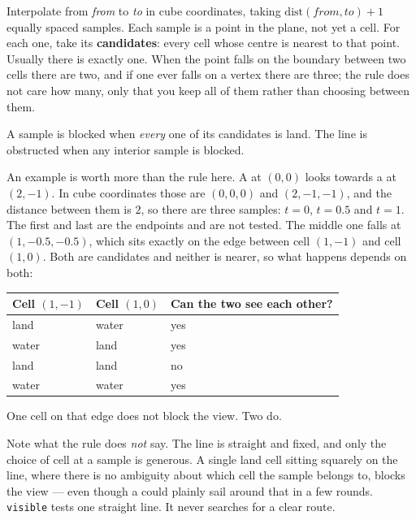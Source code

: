 \documentclass{article}
\begin{document}
Interpolate from \emph{from} to \emph{to} in cube coordinates, taking
$\mathrm{dist}(\mathit{from},\mathit{to}) + 1$ equally spaced samples. Each sample is a point in
the plane, not yet a cell. For each one, take its \textbf{candidates}: every cell whose centre is
nearest to that point. Usually there is exactly one. When the point falls on the boundary between
two cells there are two, and if one ever falls on a vertex there are three; the rule does not care
how many, only that you keep all of them rather than choosing between them.

\begin{center}
A sample is blocked when \emph{every} one of its candidates is land. The line is obstructed when
any interior sample is blocked.
\end{center}

An example is worth more than the rule here. A \ship{} at $(0,0)$ looks towards a \ship{} at
$(2,-1)$. In cube coordinates those are $(0,0,0)$ and $(2,-1,-1)$, and the distance between them is
$2$, so there are three samples: $t = 0$, $t = 0.5$ and $t = 1$. The first and last are the
endpoints and are not tested. The middle one falls at $(1, -0.5, -0.5)$, which sits exactly on the
edge between cell $(1,-1)$ and cell $(1,0)$. Both are candidates and neither is nearer, so what
happens depends on both:

\begin{center}
\begin{tabular}{|l|l|l|}
 \hline
 {\bf Cell $(1,-1)$} & {\bf Cell $(1,0)$} & {\bf Can the two \ships{} see each other?} \\
 \hline\hline
 land & water & yes \\
 \hline
 water & land & yes \\
 \hline
 land & land & no \\
 \hline
 water & water & yes \\
 \hline
\end{tabular}
\end{center}

One \island{} cell on that edge does not block the view. Two do.

Note what the rule does \emph{not} say. The line is straight and fixed, and only the choice of cell
at a sample is generous. A single land cell sitting squarely on the line, where there is no
ambiguity about which cell the sample belongs to, blocks the view --- even though a \ship{} could
plainly sail around that \island{} in a few rounds. \texttt{visible} tests one straight line. It
never searches for a clear route.
\end{document}
